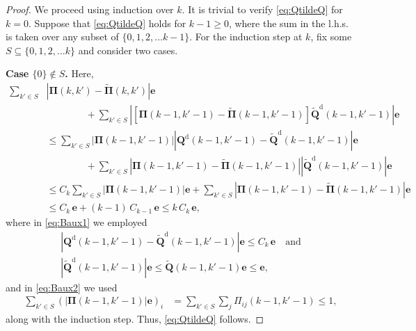 \documentclass[10pt,a4paper]{amsart}
\newcommand{\tld}[1]{\widetilde{#1}}
\begin{document}
\begin{proof}
We proceed using induction over $k$. It is trivial to verify \eqref{eq:QtildeQ} for $k=0$. Suppose that \eqref{eq:QtildeQ} holds for $k-1\ge 0$, where the sum in the l.h.s. is taken over any subset of $\{0,1,2,\dots k-1\}$. For the induction step at $k$, fix some $S\subseteq\{0,1,2,\dots k\}$ and consider two cases.

\textbf{Case $\{0\}\notin S$.} Here,
\begin{align}
\sum_{k'\in S}&\left|{\bm{\Pi}}(k,k')-\tld{\bm{\Pi}}(k,k')\right|\bm{e}\nonumber\\
&\qquad\qquad + \sum_{k'\in S}\left| \left[{\bm{\Pi}}(k-1,k'-1)-\tld{\bm{\Pi}}(k-1,k'-1)\right]\tld{\bm{Q}}^{\mathrm{d}}(k-1,k'-1)\right|\bm{e}\nonumber\\
&\le\sum_{k'\in S}\left|  {\bm{\Pi}}(k-1,k'-1)\right| \left|{\bm{Q}}^{\mathrm{d}}(k-1,k'-1)-\tld{\bm{Q}}^{\mathrm{d}}(k-1,k'-1)\right|\bm{e}\nonumber\\
&\qquad\qquad + \sum_{k'\in S}\left| {\bm{\Pi}}(k-1,k'-1)-\tld{\bm{\Pi}}(k-1,k'-1)\right|\left|\tld{\bm{Q}}^{\mathrm{d}}(k-1,k'-1)\right|\bm{e}\nonumber\\
&\le C_{k}\sum_{k'\in S}\left|  {\bm{\Pi}}(k-1,k'-1)\right|\bm{e} + \sum_{k'\in S}\left| {\bm{\Pi}}(k-1,k'-1)-\tld{\bm{\Pi}}(k-1,k'-1)\right|\bm{e}\label{eq:Baux1}\\
&\le C_{k}\,\bm{e} + (k-1)\,C_{k-1}\,\bm{e}\le k\,C_k\,\bm{e},\label{eq:Baux2}
\end{align}
where in \eqref{eq:Baux1} we employed 
\[\begin{gathered}
|{\bm{Q}}^{\mathrm{d}}(k-1,k'-1) - \tld{\bm{Q}}^{\mathrm{d}}(k-1,k'-1)|\bm{e}\le C_{k}\,\bm{e}\quad\mbox{and}\\
 |\tld{\bm{Q}}^{\mathrm{d}}(k-1,k'-1)|\bm{e}\le\tld{\bm{Q}}(k-1,k'-1) \bm{e}\le \bm{e},
 \end{gathered}\]
  and in \eqref{eq:Baux2} we used
\begin{align*}
\sum_{k'\in S}(\left|{\bm{\Pi}}(k-1,k'-1)\right|\bm{e})_i& = \sum_{k'\in S}\sum_{j}\Pi_{ij}(k-1,k'-1) \le 1,
\end{align*}
along with the induction step. Thus, \eqref{eq:QtildeQ} follows.


\end{proof}
\end{document}

